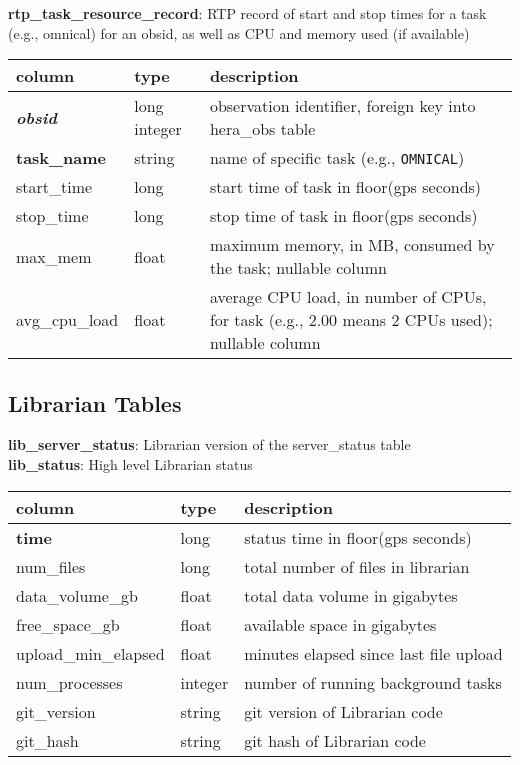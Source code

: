 \documentclass{article}
\begin{document}
\textbf{\large{rtp\_task\_resource\_record}}: RTP record of start and stop times for a task (e.g., omnical) for an obsid, as well as CPU and memory used (if available)
\begin{center}
  \begin{tabular}{| p{4cm} | p{2cm} | p{10cm} |}
\hline
 column & type & description \\ [0.5ex] \hline\hline
\textit{\textbf{obsid}} & long integer & observation identifier, foreign key into hera\_obs table \\ \hline
\textbf{task\_name} & string & name of specific task (e.g., \verb+OMNICAL+) \\ \hline
start\_time & long & start time of task in floor(gps seconds) \\ \hline
stop\_time & long & stop time of task in floor(gps seconds) \\ \hline
max\_mem & float & maximum memory, in MB, consumed by the task; nullable column \\ \hline
avg\_cpu\_load & float & average CPU load, in number of CPUs, for task (e.g., 2.00 means 2 CPUs used); nullable column \\ \hline
\end{tabular}
\end{center}


\subsection{Librarian Tables}
\textbf{\large{lib\_server\_status}}: Librarian version of the server\_status table\\

\textbf{\large{lib\_status}}: High level Librarian status
\begin{center}
 \begin{tabular}{| p{4cm} | p{2cm} | p{10cm} |} 
\hline
 column & type & description \\ [0.5ex]  \hline\hline
\textbf{time} & long & status time in floor(gps seconds) \\ \hline
num\_files & long & total number of files in librarian  \\\hline
data\_volume\_gb & float & total data volume in gigabytes  \\\hline
free\_space\_gb & float & available space in gigabytes  \\\hline
upload\_min\_elapsed & float & minutes elapsed since last file upload \\\hline
num\_processes & integer & number of running background tasks  \\\hline
git\_version & string & git version of Librarian code  \\\hline
git\_hash & string & git hash of Librarian code  \\\hline
\end{tabular}
\end{center}
\end{document}
